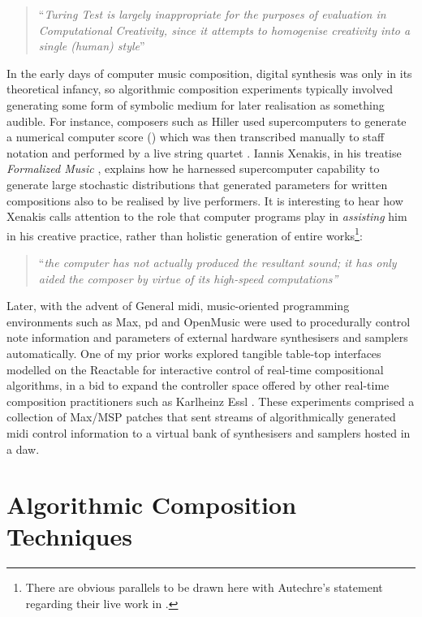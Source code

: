 \blockcquote[]{Pease2011}{``\textit{Turing Test is largely inappropriate for the purposes of evaluation in Computational Creativity, since it attempts to homogenise creativity into a single (human) style}''}

In the early days of computer music composition, digital synthesis was only in its theoretical infancy, so algorithmic composition experiments typically involved generating some form of symbolic medium for later realisation as something audible. For instance, composers such as Hiller used supercomputers to generate a numerical computer score () which was then transcribed manually to staff notation and performed by a live string quartet \citep{Hiller1979}. Iannis Xenakis, in his treatise \textit{Formalized Music} \citep{Bradshaw1973}, explains how he harnessed supercomputer capability to generate large stochastic distributions that generated parameters for written compositions also to be realised by live performers. It is interesting to hear  how Xenakis calls attention to the role that computer programs play in \textit{assisting} him in his creative practice, rather than holistic generation of entire works\footnote{There are obvious parallels to be drawn here with Autechre's statement regarding their live work in .}:

\blockcquote[]{Cope2000}{``\textit{the computer has not actually produced the resultant sound; it has only aided the composer by virtue of its high-speed computations''}}

Later, with the advent of General \acrshort{midi}, music-oriented programming environments such as Max, \acrshort{pd} and OpenMusic were used to procedurally control note information and parameters of external hardware synthesisers and samplers automatically. One of my prior works \citep{Nuanain2014} explored tangible table-top interfaces modelled on the Reactable \citep{Jorda2005} for interactive control of real-time compositional algorithms, in a bid to expand the controller space offered by other real-time composition practitioners such as Karlheinz Essl \citep{Essl2014}. These experiments comprised a collection of Max/MSP patches that sent streams of algorithmically generated \acrshort{midi} control information to a virtual bank of synthesisers and samplers hosted in a \acrshort{daw}.

\section{Algorithmic Composition Techniques}

